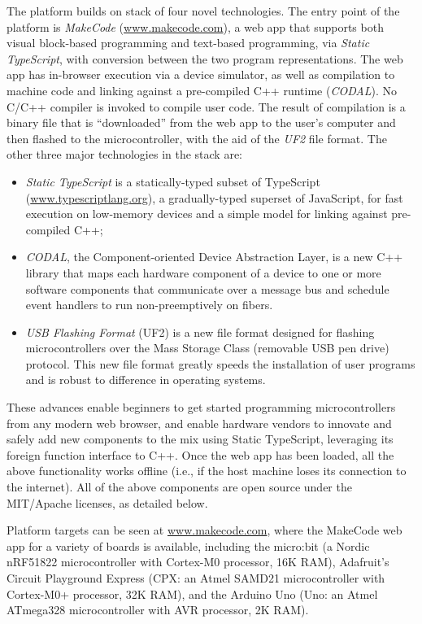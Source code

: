 The platform builds on stack of four novel technologies.
The entry point of the platform is \emph{MakeCode} (\url{www.makecode.com}),
a web app that supports both visual block-based programming and text-based programming,
via \emph{Static TypeScript}, with conversion 
between the two program representations. The web app has in-browser execution 
via a device simulator, as well as compilation to machine code and linking against a 
pre-compiled C++ runtime (\emph{CODAL}). No C/C++ compiler is invoked to compile user code. 
The result of compilation is a binary file that is ``downloaded'' from the web app to the user's 
computer and then flashed to the microcontroller, with the aid of the \emph{UF2} file format.
The other three major technologies in the stack are:
\begin{itemize}

\item \emph{Static TypeScript} is a statically-typed subset of TypeScript (\url{www.typescriptlang.org}), 
a gradually-typed superset of JavaScript, for fast execution on low-memory devices 
and a simple model for linking against pre-compiled C++; 

\item \emph{CODAL}, the Component-oriented Device Abstraction Layer, is a new C++ library that maps 
each hardware component of a device to one or more software components that communicate over a message bus and
schedule event handlers to run non-preemptively on fibers. 

\item \emph{USB Flashing Format} (UF2) is a new file format designed for flashing microcontrollers over the Mass Storage
Class (removable USB pen drive) protocol.  This new file format greatly speeds the installation of user programs
and is robust to difference in operating systems.
\end{itemize}
These advances enable beginners to get started programming microcontrollers from any modern web browser, and enable
hardware vendors to innovate and safely add new components to the mix using Static TypeScript, leveraging its
foreign function interface to C++. Once the web app has been loaded, 
all the above functionality works offline (i.e., if the host machine loses its connection 
to the internet).
All of the above components are open source under the MIT/Apache licenses, as detailed below. 

Platform targets can be seen at \url{www.makecode.com}, where the MakeCode web app for a variety of boards is available, 
including the micro:bit (a Nordic nRF51822 microcontroller with Cortex-M0 processor, 16K RAM), Adafruit's Circuit 
Playground Express (CPX: an Atmel SAMD21 microcontroller with Cortex-M0+ processor, 32K RAM), and the Arduino Uno 
(Uno: an Atmel ATmega328 microcontroller with AVR processor, 2K RAM). 


